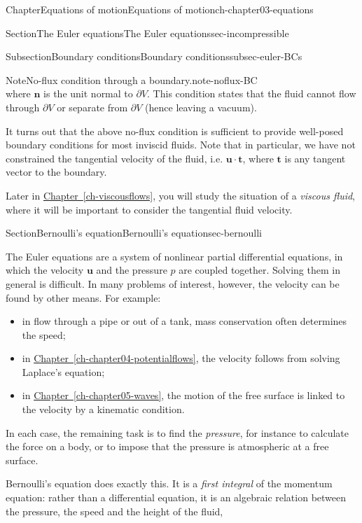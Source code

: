 \documentclass[oneside,10pt,]{book}
\newcommand{\xreffont}{\relax}
\newcommand{\ptxlistdisc}{\raisebox{0.3ex}{\textbullet}}
\numberwithin{equation}{section}
\newcommand{\bn}{\boldsymbol{n}}
\newcommand{\bt}{\boldsymbol{t}}
\newcommand{\bu}{\boldsymbol{u}}
\renewcommand{\bt}{\boldsymbol{t}}
\begin{document}
\begin{chapterptx}{Chapter}{Equations of motion}{}{Equations of motion}{}{}{ch-chapter03-equations}
\begin{sectionptx}{Section}{The Euler equations}{}{The Euler equations}{}{}{sec-incompressible}
\begin{subsectionptx}{Subsection}{Boundary conditions}{}{Boundary conditions}{}{}{subsec-euler-BCs}
\begin{note}{Note}{No-flux condition through a boundary.}{note-noflux-BC}
\begin{equation}
\end{equation}
where \(\bn\) is the unit normal to \(\partial V\). This condition states that the fluid cannot flow through \(\partial V\) or separate from \(\partial V\) (hence leaving a vacuum).%
\end{note}
It turns out that the above no-flux condition is sufficient to provide well-posed boundary conditions for most inviscid fluids. Note that in particular, we have not constrained the tangential velocity of the fluid, i.e. \(\bu \cdot \bt\), where \(\bt\) is any tangent vector to the boundary.%
\par
Later in \hyperref[ch-viscousflows]{Chapter~{\xreffont\ref{ch-viscousflows}}}, you will study the situation of a \emph{viscous fluid}, where it will be important to consider the tangential fluid velocity.%
\end{subsectionptx}
\end{sectionptx}
%
%
\typeout{************************************************}
\typeout{************************************************}
%
\begin{sectionptx}{Section}{Bernoulli's equation}{}{Bernoulli's equation}{}{}{sec-bernoulli}
\begin{introduction}{}%
The Euler equations are a system of nonlinear partial differential equations, in which the velocity \(\bu\) and the pressure \(p\) are coupled together. Solving them in general is difficult. In many problems of interest, however, the velocity can be found by other means. For example:%
\begin{itemize}[label=\ptxlistdisc]
\item{}in flow through a pipe or out of a tank, mass conservation often determines the speed;%
\item{}in \hyperref[ch-chapter04-potentialflows]{Chapter~{\xreffont\ref{ch-chapter04-potentialflows}}}, the velocity follows from solving Laplace's equation;%
\item{}in \hyperref[ch-chapter05-waves]{Chapter~{\xreffont\ref{ch-chapter05-waves}}}, the motion of the free surface is linked to the velocity by a kinematic condition.%
\end{itemize}
In each case, the remaining task is to find the \emph{pressure}, for instance to calculate the force on a body, or to impose that the pressure is atmospheric at a free surface.%
\par
Bernoulli's equation does exactly this. It is a \emph{first integral} of the momentum equation: rather than a differential equation, it is an algebraic relation between the pressure, the speed and the height of the fluid,%

\end{introduction}
\end{sectionptx}
\end{chapterptx}
\end{document}
